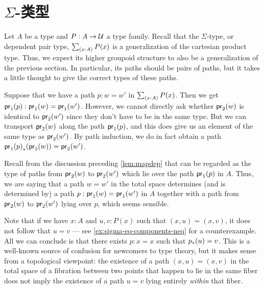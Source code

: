 %

\section{\texorpdfstring{$\Sigma$}{Σ}-类型}
\label{sec:compute-sigma}

%
Let $A$ be a type and $P:A\to\mathcal{U}$ a type family.
Recall that the $\Sigma$-type, or dependent pair type, $\sm{x:A} P(x)$ is a generalization of the cartesian product type.
Thus, we expect its higher groupoid structure to also be a generalization of the previous section.
In particular, its paths should be pairs of paths, but it takes a little thought to give the correct types of these paths.

Suppose that we have a path $p:w=w'$ in $\sm{x:A}P(x)$.
Then we get ${\mathsf{pr}_{1}}\mathopen{}\left({p}\right)\mathclose{}:\mathsf{pr}_{1}(w)=\mathsf{pr}_{1}(w')$.
However, we cannot directly ask whether $\mathsf{pr}_{2}(w)$ is identical to $\mathsf{pr}_{2}(w')$ since they don't have to be in the same type.
But we can transport $\mathsf{pr}_{2}(w)$ along the path ${\mathsf{pr}_{1}}\mathopen{}\left({p}\right)\mathclose{}$, and this does give us an element of the same type as $\mathsf{pr}_{2}(w')$.
By path induction, we do in fact obtain a path ${{\mathsf{pr}_{1}}\mathopen{}\left({p}\right)\mathclose{}}_{*}\mathopen{}\left({\mathsf{pr}_{2}(w)}\right)\mathclose{}=\mathsf{pr}_{2}(w')$.

Recall from the discussion preceding \cref{lem:mapdep} that
can be regarded as the type of paths from $\mathsf{pr}_{2}(w)$ to $\mathsf{pr}_{2}(w')$ which lie over the path ${\mathsf{pr}_{1}}\mathopen{}\left({p}\right)\mathclose{}$ in $A$.
%
%
Thus, we are saying that a path $w=w'$ in the total space determines (and is determined by) a path $p:\mathsf{pr}_{1}(w)=\mathsf{pr}_{1}(w')$ in $A$ together with a path from $\mathsf{pr}_{2}(w)$ to $\mathsf{pr}_{2}(w')$ lying over $p$, which seems sensible.

\begin{rmk}\label{rmk:sigma-equality-extraction}
  Note that if we have $x:A$ and $u,v:P(x)$ such that $(x,u)=(x,v)$, it does not follow that $u=v$ --- see \cref{ex:sigma-eq-components-neq} for a counterexample.
  All we can conclude is that there exists $p:x=x$ such that ${p}_{*}\mathopen{}\left({u}\right)\mathclose{} = v$.
  This is a well-known source of confusion for newcomers to type theory, but it makes sense from a topological viewpoint: the existence of a path $(x,u)=(x,v)$ in the total space of a fibration between two points that happen to lie in the same fiber does not imply the existence of a path $u=v$ lying entirely \emph{within} that fiber.
\end{rmk}

